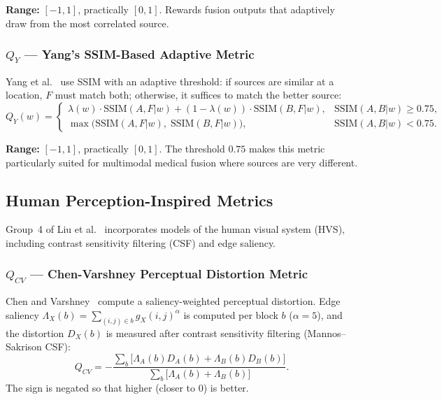 \documentclass[a4paper,12pt]{article}
\begin{document}
\textbf{Range:} $[-1, 1]$, practically $[0, 1]$.
Rewards fusion outputs that adaptively draw from the most correlated source.

\subsubsection{$Q_Y$ --- Yang's SSIM-Based Adaptive Metric}

Yang et al.~\cite{yang2008} use SSIM with an adaptive threshold: if sources
are similar at a location, $F$ must match both; otherwise, it suffices to
match the better source:
\begin{equation}
  Q_Y(w) = \begin{cases}
    \lambda(w) \cdot \text{SSIM}(A,F|w) + (1-\lambda(w)) \cdot \text{SSIM}(B,F|w),
      & \text{SSIM}(A,B|w) \geq 0.75, \\
    \max\!\bigl(\text{SSIM}(A,F|w),\; \text{SSIM}(B,F|w)\bigr),
      & \text{SSIM}(A,B|w) < 0.75.
  \end{cases}
\end{equation}

\textbf{Range:} $[-1, 1]$, practically $[0, 1]$.
The threshold $0.75$ makes this metric particularly suited for multimodal
medical fusion where sources are very different.

\subsection{Human Perception-Inspired Metrics}

Group~4 of Liu et al.~\cite{liu2012} incorporates models of the human visual
system (HVS), including contrast sensitivity filtering (CSF) and edge saliency.

\subsubsection{$Q_{CV}$ --- Chen-Varshney Perceptual Distortion Metric}

Chen and Varshney~\cite{chen2007} compute a saliency-weighted perceptual
distortion. Edge saliency $\Lambda_X(b) = \sum_{(i,j) \in b} g_X(i,j)^\alpha$
is computed per block $b$ ($\alpha = 5$), and the distortion $D_X(b)$ is
measured after contrast sensitivity filtering (Mannos--Sakrison CSF):
\begin{equation}
  Q_{CV} = -\frac{\sum_{b}\bigl[\Lambda_A(b) D_A(b) + \Lambda_B(b) D_B(b)\bigr]}
                  {\sum_{b}\bigl[\Lambda_A(b) + \Lambda_B(b)\bigr]}.
\end{equation}
The sign is negated so that higher (closer to 0) is better.
\end{document}

